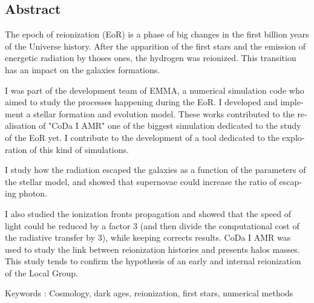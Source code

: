\begin{otherlanguage}{english}
\chapter*{Abstract}
The epoch of reionization (EoR) is a phase of big changes in the first billion years of the Universe history. After the apparition of the first stars and the emission of energetic radiation by thoses ones, the hydrogen was reionized. This transition has an impact on the galaxies formations.

I was part of the development team of EMMA, a numerical simulation code who aimed to study the  processes happening during the EoR. I developed and implement a stellar formation and evolution model. These works contributed to the realisation of "CoDa I AMR" one of the biggest simulation dedicated to the study of the EoR yet. I contribute to the development of a tool dedicated to the exploration of this kind of simulations.

I study how the radiation escaped the galaxies as a function of the parameters of the stellar model, and showed that supernovae could increase the ratio of escaping photon.

I also studied the ionization fronts propagation and showed that the speed of light could be reduced by a factor 3 (and then divide the computational cost of the radiative transfer by 3), while keeping corrects results.
CoDa I AMR was used to study the link between reionization histories and presents halos masses.
This study tends to confirm the hypothesis of an early and internal reionization of the Local Group.

\vspace{0.5cm}

Keywords : Cosmology, dark ages, reionization, first stars, numerical methods
\end{otherlanguage}

\endgroup			

\vfill





